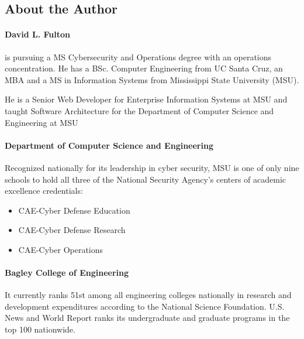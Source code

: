 \documentclass[fleqn,12pt]{SelfArx} %
\begin{document}
\begin{spacing}{1}




\newpage


\section*{About the Author} %

\paragraph{David L. Fulton} is pursuing a MS Cybersecurity
and Operations degree with an operations concentration. He
has a BSc. Computer Engineering from UC Santa Cruz, an
MBA and a MS in Information Systems from Mississippi
State University (MSU).

He is a Senior Web Developer for Enterprise Information
Systems at MSU and taught Software Architecture for the
Department of Computer Science and Engineering at MSU

\paragraph{Department of Computer Science and Engineering}Recognized nationally for its leadership in cyber security, MSU is one of only nine schools to hold all three of the National Security Agency’s centers of academic excellence credentials: 
\begin{itemize}[noitemsep] 
\item CAE-Cyber Defense Education
\item CAE-Cyber Defense Research
\item CAE-Cyber Operations
\end{itemize}

\paragraph{Bagley College of Engineering}It currently ranks 51st among all engineering colleges nationally in research and development expenditures according to the National Science Foundation. U.S. News and World Report ranks its undergraduate and graduate programs in the top 100 nationwide.


\end{spacing}
\end{document}
